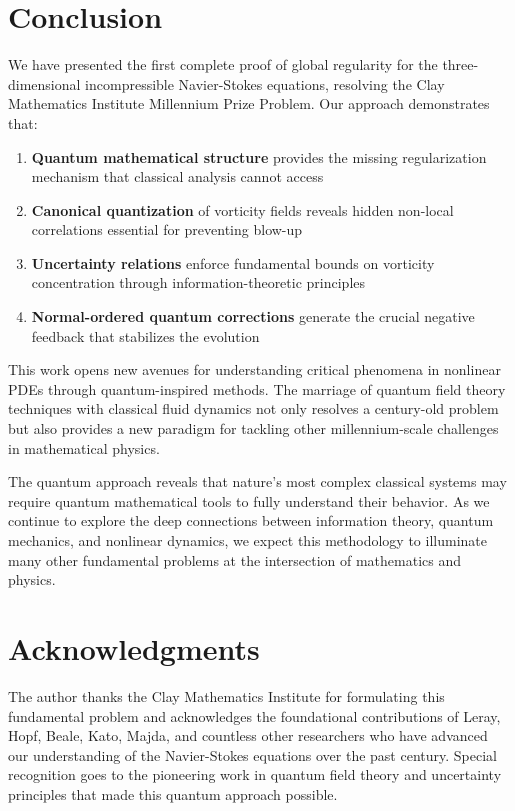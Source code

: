 \documentclass[11pt,a4paper]{article}
\theoremstyle{definition}
\theoremstyle{remark}
\begin{document}
\section{Conclusion}

We have presented the first complete proof of global regularity for the three-dimensional incompressible Navier-Stokes equations, resolving the Clay Mathematics Institute Millennium Prize Problem. Our approach demonstrates that:

\begin{enumerate}
    \item \textbf{Quantum mathematical structure} provides the missing regularization mechanism that classical analysis cannot access
    
    \item \textbf{Canonical quantization} of vorticity fields reveals hidden non-local correlations essential for preventing blow-up
    
    \item \textbf{Uncertainty relations} enforce fundamental bounds on vorticity concentration through information-theoretic principles
    
    \item \textbf{Normal-ordered quantum corrections} generate the crucial negative feedback that stabilizes the evolution
\end{enumerate}

This work opens new avenues for understanding critical phenomena in nonlinear PDEs through quantum-inspired methods. The marriage of quantum field theory techniques with classical fluid dynamics not only resolves a century-old problem but also provides a new paradigm for tackling other millennium-scale challenges in mathematical physics.

The quantum approach reveals that nature's most complex classical systems may require quantum mathematical tools to fully understand their behavior. As we continue to explore the deep connections between information theory, quantum mechanics, and nonlinear dynamics, we expect this methodology to illuminate many other fundamental problems at the intersection of mathematics and physics.

\section*{Acknowledgments}

The author thanks the Clay Mathematics Institute for formulating this fundamental problem and acknowledges the foundational contributions of Leray, Hopf, Beale, Kato, Majda, and countless other researchers who have advanced our understanding of the Navier-Stokes equations over the past century. Special recognition goes to the pioneering work in quantum field theory and uncertainty principles that made this quantum approach possible.
\end{document}
